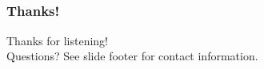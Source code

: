 \documentclass[t]{beamer}
\begin{document}






%





\subsection{}

\begin{frame}
	\frametitle{Thanks!}
		\begin{center}
			\vfill
			Thanks for listening!\\
			\vfill
			Questions?
			\vfill
			See slide footer for contact information.
			\vfill
		\end{center}
\end{frame}
\end{document}
